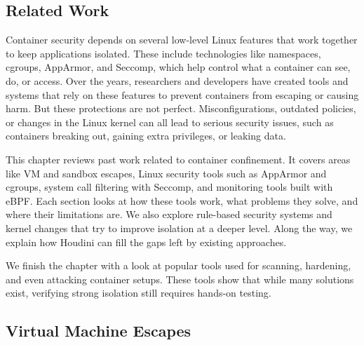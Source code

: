 \documentclass[12pt]{report}
\begin{document}
\begin{doublespace}
\chapter{Related Work}

Container security depends on several low-level Linux features that work together to keep applications isolated. These include technologies like namespaces, cgroups, AppArmor, and Seccomp, which help control what a container can see, do, or access. Over the years, researchers and developers have created tools and systems that rely on these features to prevent containers from escaping or causing harm. But these protections are not perfect. Misconfigurations, outdated policies, or changes in the Linux kernel can all lead to serious security issues, such as containers breaking out, gaining extra privileges, or leaking data.

This chapter reviews past work related to container confinement. It covers areas like VM and sandbox escapes, Linux security tools such as AppArmor and cgroups, system call filtering with Seccomp, and monitoring tools built with eBPF. Each section looks at how these tools work, what problems they solve, and where their limitations are. We also explore rule-based security systems and kernel changes that try to improve isolation at a deeper level. Along the way, we explain how Houdini can fill the gaps left by existing approaches.

We finish the chapter with a look at popular tools used for scanning, hardening, and even attacking container setups. These tools show that while many solutions exist, verifying strong isolation still requires hands-on testing.

\section{Virtual Machine Escapes} 


\end{doublespace}
\end{document}
